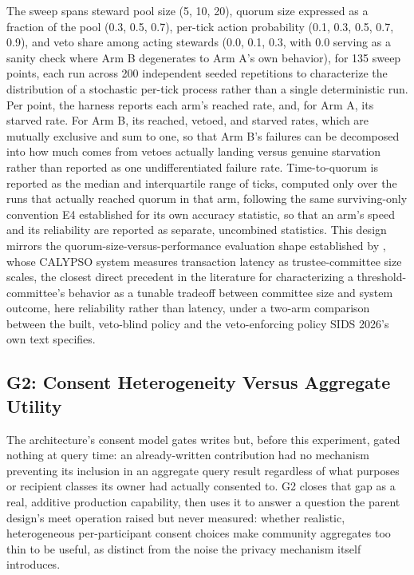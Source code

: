 The sweep spans steward pool size (5, 10, 20), quorum size expressed as a fraction of the pool (0.3, 0.5, 0.7), per-tick action probability (0.1, 0.3, 0.5, 0.7, 0.9), and veto share among acting stewards (0.0, 0.1, 0.3, with 0.0 serving as a sanity check where Arm B degenerates to Arm A's own behavior), for 135 sweep points, each run across 200 independent seeded repetitions to characterize the distribution of a stochastic per-tick process rather than a single deterministic run. Per point, the harness reports each arm's reached rate, and, for Arm A, its starved rate. For Arm B, its reached, vetoed, and starved rates, which are mutually exclusive and sum to one, so that Arm B's failures can be decomposed into how much comes from vetoes actually landing versus genuine starvation rather than reported as one undifferentiated failure rate. Time-to-quorum is reported as the median and interquartile range of ticks, computed only over the runs that actually reached quorum in that arm, following the same surviving-only convention E4 established for its own accuracy statistic, so that an arm's speed and its reliability are reported as separate, uncombined statistics. This design mirrors the quorum-size-versus-performance evaluation shape established by \cite{kokoriskogias2020}, whose CALYPSO system measures transaction latency as trustee-committee size scales, the closest direct precedent in the literature for characterizing a threshold-committee's behavior as a tunable tradeoff between committee size and system outcome, here reliability rather than latency, under a two-arm comparison between the built, veto-blind policy and the veto-enforcing policy SIDS 2026's own text specifies.

\subsection{G2: Consent Heterogeneity Versus Aggregate Utility}

The architecture's consent model gates writes but, before this experiment, gated nothing at query time: an already-written contribution had no mechanism preventing its inclusion in an aggregate query result regardless of what purposes or recipient classes its owner had actually consented to. G2 closes that gap as a real, additive production capability, then uses it to answer a question the parent design's meet operation raised but never measured: whether realistic, heterogeneous per-participant consent choices make community aggregates too thin to be useful, as distinct from the noise the privacy mechanism itself introduces.

